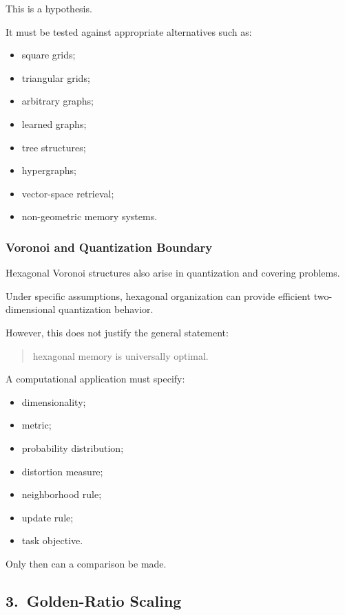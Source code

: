 This is a hypothesis.

It must be tested against appropriate alternatives such as:

\begin{itemize}
    \item square grids;
    \item triangular grids;
    \item arbitrary graphs;
    \item learned graphs;
    \item tree structures;
    \item hypergraphs;
    \item vector-space retrieval;
    \item non-geometric memory systems.
\end{itemize}

\subsubsection*{Voronoi and Quantization Boundary}

Hexagonal Voronoi structures also arise in quantization and covering problems.

Under specific assumptions, hexagonal organization can provide efficient
two-dimensional quantization behavior.

However, this does not justify the general statement:

\begin{quote}
hexagonal memory is universally optimal.
\end{quote}

A computational application must specify:

\begin{itemize}
    \item dimensionality;
    \item metric;
    \item probability distribution;
    \item distortion measure;
    \item neighborhood rule;
    \item update rule;
    \item task objective.
\end{itemize}

Only then can a comparison be made.

\subsection*{3.\ Golden-Ratio Scaling}


